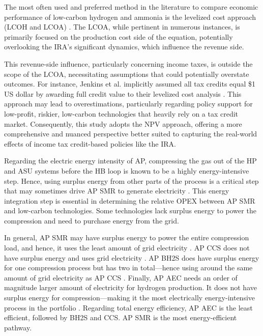 \documentclass{article}
\begin{document}
The most often used and preferred method in the literature to compare economic performance of low-carbon hydrogen and ammonia is the levelized cost approach (LCOH and LCOA) \cite{Arora2016, Campion2022, Pozo2022, Gomez2020, Guerra2020, Lee2021, LEWIS2022, Osman2020, Rouwenhorst2019, Sanchez2019, Sousa2022, Tock2013, TUNA2014, Wang2020, Zhang2020}. The LCOA, while pertinent in numerous instances, is primarily focused on the production cost side of the equation, potentially overlooking the IRA's significant dynamics, which influence the revenue side.

This revenue-side influence, particularly concerning income taxes, is outside the scope of the LCOA, necessitating assumptions that could potentially overstate outcomes. For instance, Jenkins et al. implicitly assumed all tax credits equal \$1 US dollar by awarding full credit value to their levelized cost analysis \cite{Jenkins2023}. This approach may lead to overestimations, particularly regarding policy support for low-profit, riskier, low-carbon technologies that heavily rely on a tax credit market. Consequently, this study adopts the NPV approach, offering a more comprehensive and nuanced perspective better suited to capturing the real-world effects of income tax credit-based policies like the IRA.

Regarding the electric energy intensity of AP, compressing the gas out of the HP and ASU systems before the HB loop is known to be a highly energy-intensive step. Hence, using surplus energy from other parts of the process is a critical step that may sometimes drive AP SMR to generate electricity \cite{IEAGHG2017}. This energy integration step is essential in determining the relative OPEX between AP SMR and low-carbon technologies. Some technologies lack surplus energy to power the compression and need to purchase energy from the grid.

In general, AP SMR may have surplus energy to power the entire compression load, and hence, it uses the least amount of grid electricity \cite{LEWIS2022, IEAGHG2017}. AP CCS does not have surplus energy and uses grid electricity \cite{IEAGHG2017, LEWIS2022}. AP BH2S does have surplus energy for one compression process but has two in total—hence using around the same amount of grid electricity as AP CCS \cite{Spath2005}. Finally, AP AEC needs an order of magnitude larger amount of electricity for hydrogen production. It does not have surplus energy for compression—making it the most electrically energy-intensive process in the portfolio \cite{Gomez2020}. Regarding total energy efficiency, AP AEC is the least efficient, followed by BH2S and CCS. AP SMR is the most energy-efficient pathway\cite{Pozo2022, Smith2020, Tock2013, Spath2005}.
\end{document}
